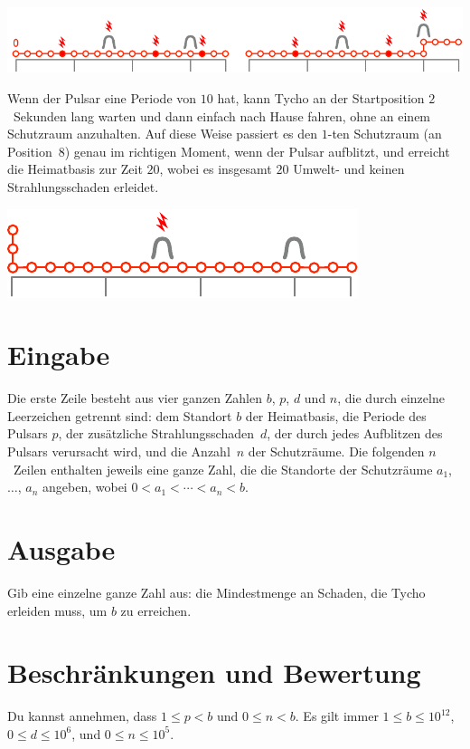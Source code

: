 \includegraphics[width=.8\textwidth]{img/sample1_2.pdf}

Wenn der Pulsar eine Periode von $10$ hat, kann Tycho an der Startposition $2$~Sekunden lang warten und dann einfach nach Hause fahren, ohne an einem Schutzraum anzuhalten.
Auf diese Weise passiert es den $1$-ten Schutzraum (an Position~$8$) genau im richtigen Moment, wenn der Pulsar aufblitzt, und erreicht die Heimatbasis zur Zeit $20$, wobei es insgesamt $20$ Umwelt- und keinen Strahlungsschaden erleidet.

\includegraphics[width=.4\textwidth]{img/sample3.pdf}

\section*{Eingabe}

Die erste Zeile besteht aus vier ganzen Zahlen $b$, $p$, $d$ und $n$, die durch einzelne Leerzeichen getrennt sind:
dem Standort $b$ der Heimatbasis,
die Periode des Pulsars $p$,
der zusätzliche Strahlungsschaden~$d$, der durch jedes Aufblitzen des Pulsars verursacht wird,
und die Anzahl~$n$ der Schutzräume.
Die folgenden $n$~Zeilen enthalten jeweils eine ganze Zahl, die die Standorte der Schutzräume $a_1$, $\ldots$, $a_n$ angeben, wobei 
$0<a_1<\cdots <a_n< b$. %

\section*{Ausgabe}

Gib eine einzelne ganze Zahl aus: die Mindestmenge an Schaden, die Tycho erleiden muss, um $b$ zu erreichen.

\section*{Beschränkungen und Bewertung}

Du kannst annehmen, dass
$1\leq p < b$ %
und
$0 \leq n < b$. %
Es gilt immer
$1\leq b\leq 10^{12}$, %
$0\leq d \leq 10^6$, %
und
$0\leq n \leq 10^5$. %

